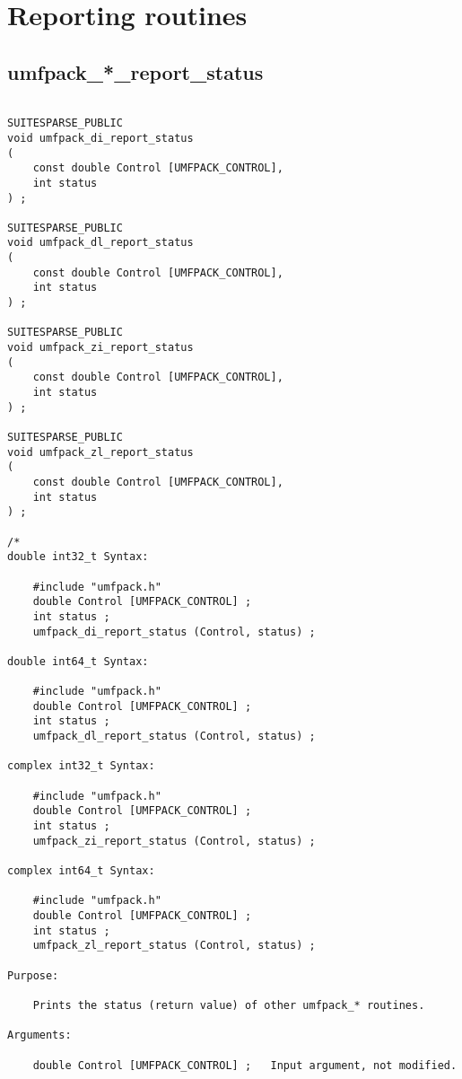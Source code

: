 \documentclass[11pt]{article}
\begin{document}
\newpage
\section{Reporting routines}
\label{Report}

\subsection{umfpack\_*\_report\_status}

{\footnotesize
\begin{verbatim}

SUITESPARSE_PUBLIC
void umfpack_di_report_status
(
    const double Control [UMFPACK_CONTROL],
    int status
) ;

SUITESPARSE_PUBLIC
void umfpack_dl_report_status
(
    const double Control [UMFPACK_CONTROL],
    int status
) ;

SUITESPARSE_PUBLIC
void umfpack_zi_report_status
(
    const double Control [UMFPACK_CONTROL],
    int status
) ;

SUITESPARSE_PUBLIC
void umfpack_zl_report_status
(
    const double Control [UMFPACK_CONTROL],
    int status
) ;

/*
double int32_t Syntax:

    #include "umfpack.h"
    double Control [UMFPACK_CONTROL] ;
    int status ;
    umfpack_di_report_status (Control, status) ;

double int64_t Syntax:

    #include "umfpack.h"
    double Control [UMFPACK_CONTROL] ;
    int status ;
    umfpack_dl_report_status (Control, status) ;

complex int32_t Syntax:

    #include "umfpack.h"
    double Control [UMFPACK_CONTROL] ;
    int status ;
    umfpack_zi_report_status (Control, status) ;

complex int64_t Syntax:

    #include "umfpack.h"
    double Control [UMFPACK_CONTROL] ;
    int status ;
    umfpack_zl_report_status (Control, status) ;

Purpose:

    Prints the status (return value) of other umfpack_* routines.

Arguments:

    double Control [UMFPACK_CONTROL] ;   Input argument, not modified.


\end{verbatim}}
\end{document}
